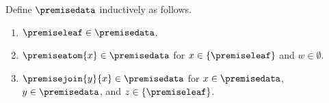 \begin{datatype}\label{premise_data}
    Define $\premisedata$ inductively as follows.
    \begin{enumerate}
        \item $\premiseleaf \in \premisedata$.
        \item $\premiseatom{x} \in \premisedata$ for
            $x \in \{\premiseleaf\}$ and $w \in \emptyset$.
        \item $\premisejoin{y}{x} \in \premisedata$ for
            $x \in \premisedata$, $y \in \premisedata$, and
            $z \in \{\premiseleaf\}$.
    \end{enumerate}
\end{datatype}
